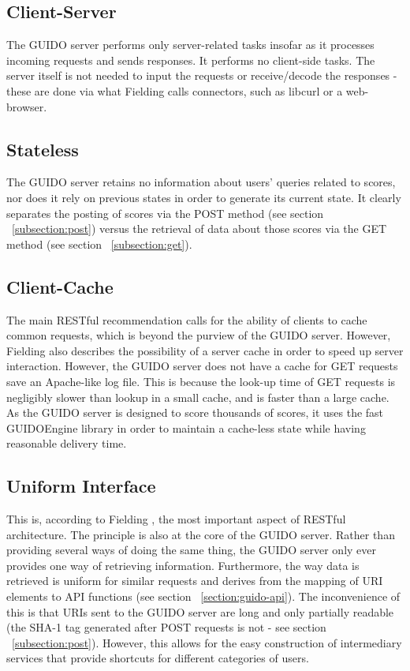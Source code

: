 \documentclass{article}
\begin{document}
\subsection{Client-Server}
The GUIDO server performs only server-related tasks insofar as it processes incoming requests and sends responses.  It performs no client-side tasks.  The server itself is not needed to input the requests or receive/decode the responses - these are done via what Fielding\cite{Fielding00} calls connectors, such as libcurl or a web-browser.
\subsection{Stateless}
The GUIDO server retains no information about users' queries related to scores, nor does it rely on previous states in order to generate its current state.  It clearly separates the posting of scores via the POST method (see section ~\ref{subsection:post}) versus the retrieval of data about those scores via the GET method (see section ~\ref{subsection:get}).
\subsection{Client-Cache}
The main RESTful recommendation calls for the ability of clients to cache common requests, which is beyond the purview of the GUIDO server.  However, Fielding \cite{Fielding00} also describes the possibility of a server cache in order to speed up server interaction.  However, the GUIDO server does not have a cache for GET requests save an Apache-like log file.  This is because the look-up time of GET requests is negligibly slower than lookup in a small cache, and is faster than a large cache.  As the GUIDO server is designed to score thousands of scores, it uses the fast GUIDOEngine library in order to maintain a cache-less state while having reasonable delivery time.
\subsection{Uniform Interface}
This is, according to Fielding \cite{Fielding00}, the most important aspect of RESTful architecture.  The principle is also at the core of the GUIDO server.  Rather than providing several ways of doing the same thing, the GUIDO server only ever provides one way of retrieving information.  Furthermore, the way data is retrieved is uniform for similar requests and derives from the mapping of URI elements to API functions (see section ~\ref{section:guido-api}).  The inconvenience of this is that URIs sent to the GUIDO server are long and only partially readable (the SHA-1 tag generated after POST requests is not - see section ~\ref{subsection:post}).  However, this allows for the easy construction of intermediary services that provide shortcuts for different categories of users.
\end{document}
